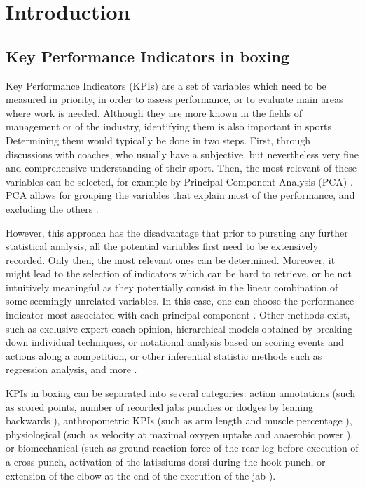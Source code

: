 \newpage

\section{Introduction}

\subsection{Key Performance Indicators in boxing}

Key Performance Indicators (KPIs) are a set of variables which need to be measured in priority, in order to assess performance, or to evaluate main areas where work is needed. Although they are more known in the fields of management or of the industry, identifying them is also important in sports \cite{Hughes2002,Butterworth2013}. Determining them would typically be done in two steps. First, through discussions with coaches, who usually have a subjective, but nevertheless very fine and comprehensive understanding of their sport. Then, the most relevant of these variables can be selected, for example by Principal Component Analysis (PCA) \cite{Hotelling1933}. PCA allows for grouping the variables that explain most of the performance, and excluding the others \cite{ODonoghue2008}.

However, this approach has the disadvantage that prior to pursuing any further statistical analysis, all the potential variables first need to be extensively recorded. Only then, the most relevant ones can be determined. Moreover, it might lead to the selection of indicators which can be hard to retrieve, or be not intuitively meaningful as they potentially consist in the linear combination of some seemingly unrelated variables. In this case, one can choose the performance indicator most associated with each principal component \cite{ODonoghue2008}. Other methods exist, such as exclusive expert coach opinion, hierarchical models obtained by breaking down individual techniques, or notational analysis based on scoring events and actions along a competition, or other inferential statistic methods such as regression analysis, and more \cite{Hughes2002,Butterworth2013}.

KPIs in boxing can be separated into several categories: action annotations (such as scored points, number of recorded jabs punches or dodges by leaning backwards \cite{Thomson2013}), anthropometric KPIs (such as arm length and muscle percentage \cite{Chaabene2015}), physiological (such as velocity at maximal oxygen uptake and anaerobic power \cite{Chaabene2015}), or biomechanical (such as ground reaction force of the rear leg before execution of a cross punch, activation of the latissiums dorsi during the hook punch, or extension of the elbow at the end of the execution of the jab \cite{Lenetsky2020}). 

